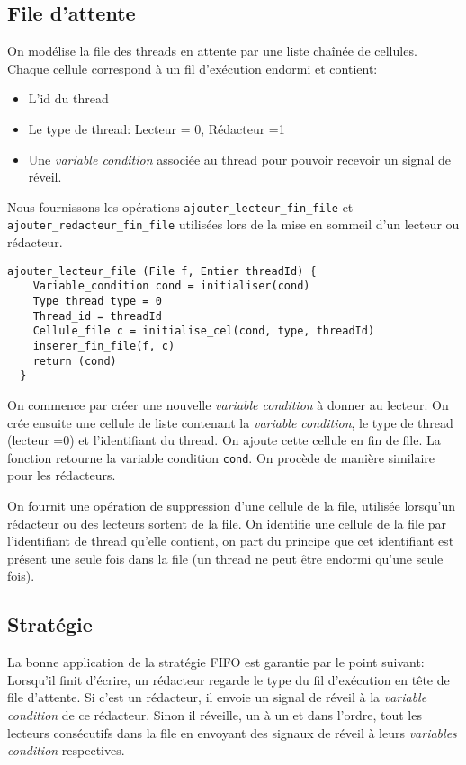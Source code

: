 \documentclass[11pt]{article}
\theoremstyle{definition}
\theoremstyle{definition}
\begin{document}
\subsection{File d'attente}
On modélise la file des threads en attente par une liste chaînée de cellules.
Chaque cellule correspond à un fil d'exécution endormi et contient:
\begin{itemize}
\item L'id du thread
\item Le type de thread: {Lecteur = 0, Rédacteur =1}
\item Une \textit{variable condition} associée au thread pour pouvoir recevoir un signal de réveil.
\end{itemize}
Nous fournissons les opérations \texttt{ajouter\_lecteur\_fin\_file} et \texttt{ajouter\_redacteur\_fin\_file} utilisées lors de la mise en sommeil d'un lecteur ou rédacteur.
\begin{lstlisting}[columns=fixed,basicstyle=\small\ttfamily]
  ajouter_lecteur_file (File f, Entier threadId) {
    Variable_condition cond = initialiser(cond)
    Type_thread type = 0
    Thread_id = threadId
    Cellule_file c = initialise_cel(cond, type, threadId)
    inserer_fin_file(f, c)
    return (cond)
  }
\end{lstlisting}
On commence par créer une nouvelle \textit{variable condition} à donner au lecteur. 
On crée ensuite une cellule de liste contenant la \textit{variable condition}, le type de thread (lecteur =0) et l'identifiant du thread. On ajoute cette cellule en fin de file.
La fonction retourne la variable condition \texttt{cond}. On procède de manière similaire pour les rédacteurs.

On fournit une opération de suppression d'une cellule de la file, utilisée lorsqu'un rédacteur
ou des lecteurs sortent de la file. On identifie une cellule de la file par l'identifiant de thread qu'elle contient, on part du principe que cet identifiant est présent une seule fois dans la file (un thread ne peut être endormi qu'une seule fois).

\subsection{Stratégie}
La bonne application de la stratégie FIFO est garantie par le point suivant:
Lorsqu'il finit d'écrire, un rédacteur regarde le type du fil d'exécution en tête de file d'attente.
Si c'est un rédacteur, il envoie un signal de réveil à la \textit{variable condition} de ce rédacteur.
Sinon il réveille, un à un et dans l'ordre, tout les lecteurs consécutifs dans la file en envoyant des signaux de réveil à leurs \textit{variables condition}
respectives.
\end{document}
